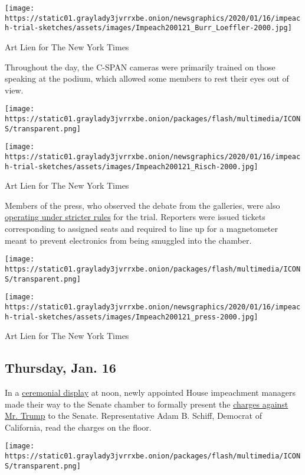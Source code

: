 \texttt{[image: https://static01.graylady3jvrrxbe.onion/newsgraphics/2020/01/16/impeach-trial-sketches/assets/images/Impeach200121\_Burr\_Loeffler-2000.jpg]}

Art Lien for The New York Times

Throughout the day, the C-SPAN cameras were primarily trained on those
speaking at the podium, which allowed some members to rest their eyes
out of view.

\texttt{[image: https://static01.graylady3jvrrxbe.onion/packages/flash/multimedia/ICONS/transparent.png]}

\texttt{[image: https://static01.graylady3jvrrxbe.onion/newsgraphics/2020/01/16/impeach-trial-sketches/assets/images/Impeach200121\_Risch-2000.jpg]}

Art Lien for The New York Times

Members of the press, who observed the debate from the galleries, were
also
\href{https://www.nytimes3xbfgragh.onion/2020/01/19/business/media/senate-impeachment-trial-media.html}{operating
under stricter rules} for the trial. Reporters were issued tickets
corresponding to assigned seats and required to line up for a
magnetometer meant to prevent electronics from being smuggled into the
chamber.

\texttt{[image: https://static01.graylady3jvrrxbe.onion/packages/flash/multimedia/ICONS/transparent.png]}

\texttt{[image: https://static01.graylady3jvrrxbe.onion/newsgraphics/2020/01/16/impeach-trial-sketches/assets/images/Impeach200121\_press-2000.jpg]}

Art Lien for The New York Times

\hypertarget{thursday-jan-16}{%
\subsection{Thursday, Jan. 16}\label{thursday-jan-16}}

In a
\href{https://www.nytimes3xbfgragh.onion/live/2020/trump-impeachment-01-16/silence-in-the-senate-as-managers-present-the-articles\#live-blog-list}{ceremonial
display} at noon, newly appointed House impeachment managers made their
way to the Senate chamber to formally present the
\href{https://www.nytimes3xbfgragh.onion/interactive/2019/12/10/us/politics/articles-impeachment-document-pdf.html}{charges
against Mr. Trump} to the Senate. Representative Adam B. Schiff,
Democrat of California, read the charges on the floor.

\texttt{[image: https://static01.graylady3jvrrxbe.onion/packages/flash/multimedia/ICONS/transparent.png]}

